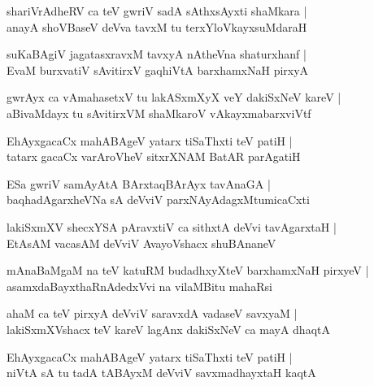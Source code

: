 \begin{shloka}
shariVrAdheRV ca teV gwriV sadA sAthxsAyxti shaMkara |\\
anayA shoVBaseV deVva tavxM tu terxYloVkayxsuMdaraH 
\end{shloka}

\begin{shloka}
suKaBAgiV jagatasxravxM tavxyA nAtheVna shaturxhanf |\\
EvaM burxvatiV sAvitirxV gaqhiVtA barxhamxNaH pirxyA
\end{shloka}

\begin{shloka}
gwrAyx ca vAmahasetxV tu lakASxmXyX veY dakiSxNeV kareV |\\
aBivaMdayx tu sAvitirxVM shaMkaroV vAkayxmabarxviVtf
\end{shloka}

\begin{shloka}
EhAyxgacaCx mahABAgeV yatarx tiSaThxti teV patiH |\\
tatarx gacaCx varAroVheV sitxrXNAM BatAR parAgatiH 
\end{shloka}

\begin{shloka}
ESa gwriV samAyAtA BArxtaqBArAyx tavAnaGA |\\
baqhadAgarxheVNa sA deVviV parxNAyAdagxMtumicaCxti
\end{shloka}

\begin{shloka}
lakiSxmXV shecxYSA pAravxtiV ca sithxtA deVvi tavAgarxtaH |\\
EtAsAM vacasAM deVviV AvayoVshacx shuBAnaneV
\end{shloka}

\begin{shloka}
mAnaBaMgaM na teV katuRM budadhxyXteV barxhamxNaH pirxyeV |\\
asamxdaBayxthaRnAdedxVvi na vilaMBitu mahaRsi 
\end{shloka}

\begin{shloka}
ahaM ca teV pirxyA deVviV saravxdA vadaseV savxyaM |\\
lakiSxmXVshacx teV kareV lagAnx dakiSxNeV ca mayA dhaqtA 
\end{shloka}

\begin{shloka}
EhAyxgacaCx mahABAgeV yatarx tiSaThxti teV patiH |\\
niVtA sA tu tadA tABAyxM deVviV savxmadhayxtaH kaqtA 
\end{shloka}

